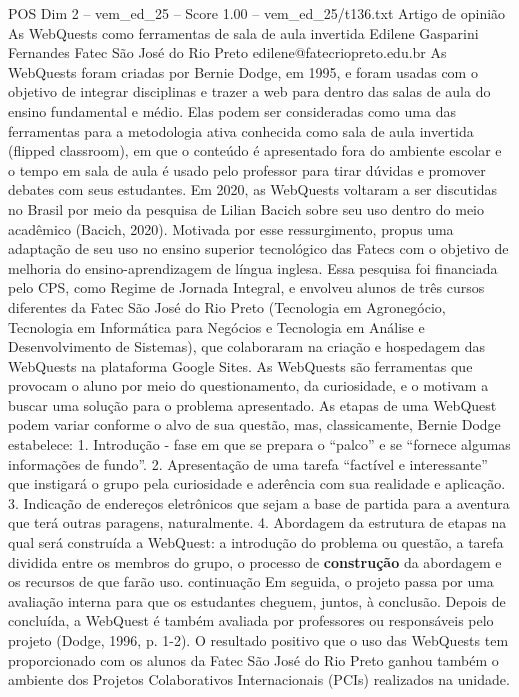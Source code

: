 \begin{textsample}{POS Dim 2 – vem\_ed\_25 – Score 1.00 – vem\_ed\_25/t136.txt}  \label{ex:f2_pos_053}
Artigo de opinião As WebQuests como ferramentas de sala de aula invertida Edilene Gasparini Fernandes Fatec São José do Rio Preto edilene@fatecriopreto.edu.br As WebQuests foram criadas por Bernie Dodge, em 1995, e foram usadas com o objetivo de integrar disciplinas e trazer a web para dentro das salas de aula do ensino fundamental e médio.
Elas podem ser consideradas como uma das ferramentas para a metodologia ativa conhecida como sala de aula invertida (flipped classroom), em que o conteúdo é apresentado fora do ambiente escolar e o tempo em sala de aula é usado pelo professor para tirar dúvidas e promover debates com seus estudantes.
Em 2020, as WebQuests voltaram a ser discutidas no Brasil por meio da pesquisa de Lilian Bacich sobre seu uso dentro do meio acadêmico (Bacich, 2020).
Motivada por esse ressurgimento, propus uma adaptação de seu uso no ensino superior tecnológico das Fatecs com o objetivo de melhoria do ensino-aprendizagem de língua inglesa.
Essa pesquisa foi financiada pelo CPS, como Regime de Jornada Integral, e envolveu alunos de três cursos diferentes da Fatec São José do Rio Preto (Tecnologia em Agronegócio, Tecnologia em Informática para Negócios e Tecnologia em Análise e Desenvolvimento de Sistemas), que colaboraram na criação e hospedagem das WebQuests na plataforma Google Sites.
As WebQuests são ferramentas que provocam o aluno por meio do questionamento, da curiosidade, e o motivam a buscar uma solução para o problema apresentado.
As etapas de uma WebQuest podem variar conforme o alvo de sua questão, mas, classicamente, Bernie Dodge estabelece: 1.
Introdução - fase em que se prepara o “palco” e se “fornece algumas informações de fundo”. 2.
Apresentação de uma tarefa “factível e interessante” que instigará o grupo pela curiosidade e aderência com sua realidade e aplicação. 3.
Indicação de endereços eletrônicos que sejam a base de partida para a aventura que terá outras paragens, naturalmente. 4.
Abordagem da estrutura de etapas na qual será construída a WebQuest: a introdução do problema ou questão, a tarefa dividida entre os membros do grupo, o processo de \textbf{construção} da abordagem e os recursos de que farão uso. continuação Em seguida, o projeto passa por uma avaliação interna para que os estudantes cheguem, juntos, à conclusão.
Depois de concluída, a WebQuest é também avaliada por professores ou responsáveis pelo projeto (Dodge, 1996, p. 1-2).
O resultado positivo que o uso das WebQuests tem proporcionado com os alunos da Fatec São José do Rio Preto ganhou também o ambiente dos Projetos Colaborativos Internacionais (PCIs) realizados na unidade.

\end{textsample}
